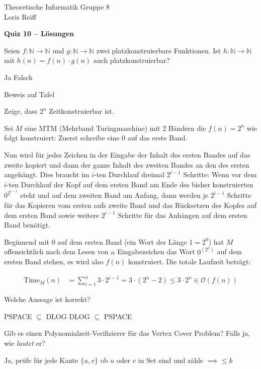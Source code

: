\documentclass[a4paper,ngerman,12pt]{exam}
\begin{document}
\noindent Theoretische Informatik \hfill Gruppe 8 \\
\mbox{}\hfill Loris Reiff
\begin{center}
  \bfseries\Large
  Quiz 10 \ifprintanswers
  -- Lösungen
\fi
\end{center}


\begin{questions}
\question
  Seien $f: \mathbb{N} \to \mathbb{N}$ und $g: \mathbb{N} \to \mathbb{N}$ zwei platzkonstruierbare Funktionen.
  Ist $h: \mathbb{N} \to \mathbb{N}$ mit $h(n) = f(n)\cdot g(n)$ auch platzkonstruierbar?
  \begin{checkboxes}
    \CorrectChoice Ja
    \choice Falsch
  \end{checkboxes}
  \begin{solution} $ $ \\
      Beweis auf Tafel
  \end{solution}
  \question
  Zeige, dass $2^n$ Zeitkonstruierbar ist.
  \begin{solutionorbox}[14em] $ $ \\
      Sei $M$ eine MTM (Mehrband Turingmaschine) mit 2 Bändern die $f(n) = 2^n$ wie folgt konstruiert:
      Zuerst schreibe eine 0 auf das erste Band.

      Nun wird für jedes Zeichen in der Eingabe der Inhalt des ersten Bandes auf das zweite kopiert und dann der ganze Inhalt des zweiten Bandes an den des ersten angehängt. Dies braucht im $i$-ten Durchlauf dreimal $2^{i-1}$ Schritte: Wenn vor dem $i$-ten Durchlauf der Kopf auf dem ersten Band am Ende des bisher konstruierten $0^{2^{i-1}}$ steht und auf dem zweiten Band am Anfang, dann werden je $2^{i-1}$ Schritte für das Kopieren vom ersten aufs zweite Band und das Rücksetzen des Kopfes auf dem ersten Band sowie weitere $2^{i-1}$ Schritte für das Anhängen auf dem ersten Band benötigt.

      Beginnend mit 0 auf dem ersten Band (ein Wort der Länge $1 = 2^0$) hat $M$ offensichtlich nach dem Lesen von $n$ Eingabezeichen das Wort $0^{(2^n)}$ auf dem ersten Band stehen, es wird also $f(n)$ konstruiert. Die totale Laufzeit beträgt:

      \begin{align}
          \text{Time}_M(n) &= \sum_{i=1}^{n} 3\cdot 2^{i-1} = 3 \cdot (2^n - 2) \leq 3 \cdot 2^n \in \mathcal{O}\left(f\left(n\right)\right)
      \end{align}
  \end{solutionorbox}
  \question
  Welche Aussage ist korrekt?
  \begin{checkboxes}
    \choice PSPACE $\subseteq$ DLOG
    \CorrectChoice DLOG $\subseteq$ PSPACE
  \end{checkboxes}
\question Gib es einen Polynomialzeit-Verifizierer für das Vertex Cover Problem? Falls ja,
  wie \textit{lautet} er?
\begin{solutionorbox}[9em]
  Ja, prüfe für jede Kante $\{u,v\}$ ob $u$ oder $v$ in Set sind und zähle $\implies \leq k$
\end{solutionorbox}
\end{questions}
\end{document}
